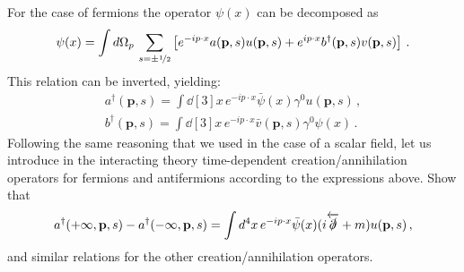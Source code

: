 \documentclass{tutorial}
\begin{document}
    For the case of fermions the operator $\psi(x)$ can be decomposed
    as
    \[
    \psi(x) = \int d\Omega_p\, \sum_{s=\pm\nicefrac{1}{2}} \left[
      e^{-i p\cdot x} a(\mathbf{p},s) u(\mathbf{p},s) + 
      e^{i p\cdot x} b^\dagger(\mathbf{p},s) v(\mathbf{p},s)
      \right]\, .
    \]
    This relation can be inverted, yielding:
    \begin{align}
      a^\dagger(\mathbf{p},s) = \int \dd[3]{x}\, e^{-ip\cdot x}
      \bar{\psi}(x) \gamma^0 u(\mathbf{p},s) \, , \nonumber \\
      b^\dagger(\mathbf{p},s) = \int \dd[3]{x}\, e^{-ip\cdot x}
      \bar{v}(\mathbf{p},s) \gamma^0 \psi(x) \, . \nonumber 
    \end{align}
    Following the same reasoning that we used in the case of a scalar
    field, let us introduce in the interacting theory time-dependent
    creation/annihilation operators for fermions and antifermions
    according to the expressions above. 
    Show that
    \begin{align}
      \label{eq:3}
      a^\dagger(+\infty,\mathbf{p},s) - 
      a^\dagger(-\infty,\mathbf{p},s) = 
      \int d^4x\,
      e^{-ip\cdot x} \bar\psi(x)
      (i\overleftarrow{\slashed{\partial}}+m) u(\mathbf{p},s)\, ,
    \end{align}
    and similar relations for the other creation/annihilation
    operators. 
 
\end{document}
